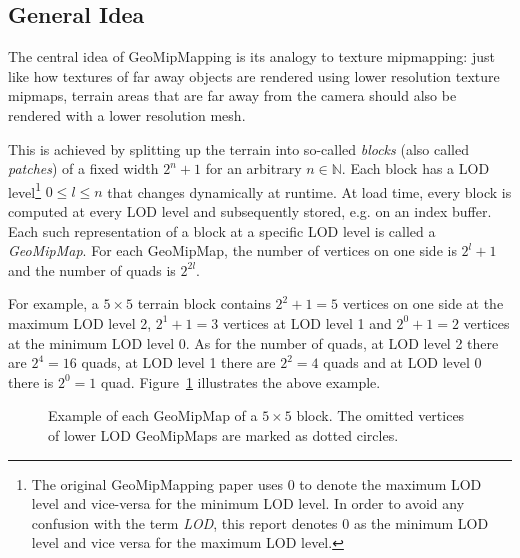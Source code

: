 \subsection{General Idea}
The central idea of GeoMipMapping is its analogy to texture mipmapping: just like how textures of far away objects are rendered using lower resolution texture mipmaps,
terrain areas that are far away from the camera should also be rendered with a lower resolution mesh.

This is achieved by splitting up the terrain into so-called \textit{blocks} (also called \textit{patches}) of a fixed width $2^n + 1$ for an arbitrary $n \in \mathbb{N}$.
Each block has a LOD level\footnote{The original GeoMipMapping paper uses 0 to denote the maximum LOD level and vice-versa for the minimum LOD level. In order to avoid any confusion with the term \textit{LOD}, this report denotes 0 as the minimum LOD level and vice versa for the maximum LOD level.} $0\leq l \leq n$ that changes dynamically at runtime.
At load time, every block is computed at every LOD level and subsequently stored, e.g. on an index buffer.
Each such representation of a block at a specific LOD level is called a \textit{GeoMipMap}.
For each GeoMipMap, the number of vertices on one side is $2^{l}+1$ and the number of quads is $2^{2l}$.

For example, a $5 \times 5$ terrain block contains $2^2 + 1 = 5$ vertices on one side at the maximum LOD level 2, $2^1 + 1 = 3$ vertices at LOD level 1 and $2^0 + 1 = 2$ vertices at the minimum LOD level 0.
As for the number of quads, at LOD level 2 there are $2^{4} = 16$ quads, at LOD level 1 there are $2^2 = 4$ quads and at LOD level 0 there is $2^0 = 1$ quad.
Figure~\ref{fig:geomipmapping-patch-example} illustrates the above example.


\begin{figure}[H]
  \centering
  \qquad
  \qquad
  \caption{Example of each GeoMipMap of a $5 \times 5$ block. The omitted vertices of lower LOD GeoMipMaps are marked as dotted circles.}\label{fig:geomipmapping-patch-example}
\end{figure}

